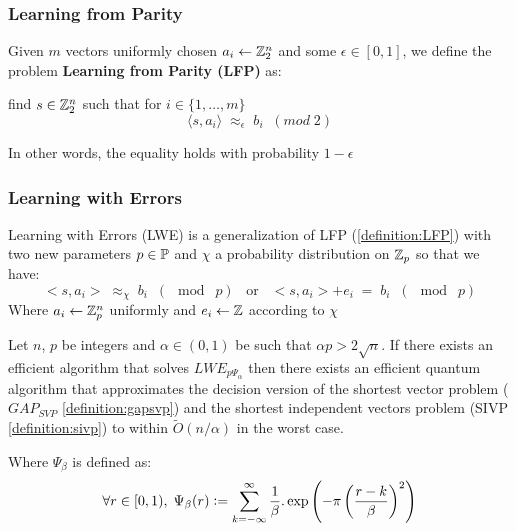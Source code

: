 \documentclass[a4paper,12pt]{article}
\begin{document}
\subsubsection{Learning from Parity}
\label{sec:org93c5d09}
 \begin{definition}
  \label{definition:LFP}
  Given $m$ vectors uniformly chosen  $a_i \gets \Z^n_2$ and some $\epsilon \in [0,1]$, we
  define the problem \textbf{Learning from Parity (LFP)} as:

  find $s \in \Z^n_2$ such that for $i \in \{1,\dots,m\}$
     $$ \langle{s, a_i}\rangle \; \approx_\epsilon \; b_i \;\; (mod\; 2) $$

     In other words, the equality holds with probability $1 - \epsilon$

\end{definition}

\subsubsection{Learning with Errors}
\label{sec:orgddb0006}
\begin{definition}\label{definition:LWE}
  Learning with Errors (LWE) is a generalization of LFP (\ref{definition:LFP}) with two new parameters $p \in \P$ and $\chi$ a probability distribution on $\Z_p$ so that we have:
\[
  <s, a_i> \; \approx_\chi \; b_i \;\; (\mod\; p) \;\;\; \text{or} \;\;\; <s, a_i> + e_i \; = \;  b_i \;\; (\mod\; p) 
    \]
     Where $a_i \gets \Z^n_p$ uniformly and $e_i \gets \Z$ according to $\chi$

\end{definition}

\begin{theorem}
  Let $n$, $p$ be integers and $\alpha \in (0, 1)$ be such that $\alpha p > 2\sqrt{n}$. If
  there exists an efficient algorithm that solves $LWE_{p \Psi_\alpha}$ then there
  exists an efficient quantum algorithm that approximates the decision version
  of the shortest vector problem ($GAP_{SVP}$ \ref{definition:gapsvp}) and the
  shortest independent vectors problem (SIVP \ref{definition:sivp}) to within
  $\tilde{O}(n/\alpha)$ in the worst case.

  Where $\Psi_\beta$ is defined as:
  $$
  \forall r \in [0,1), \; \Psi_\beta(r) \defsym \sum_{k=-\infty}^\infty{\frac{1}{\beta} . \exp{\left( -\pi \left( \frac{r-k}{\beta} \right)^2 \right)}}
  $$
\end{theorem}
\end{document}
